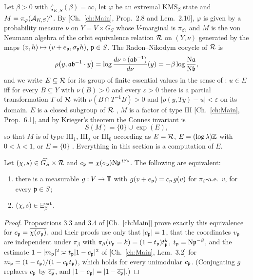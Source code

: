 Let $\beta>0$ with $\zeta_{K,S}(\beta)=\infty$, let $\varphi$ be an extremal
$\mathrm{KMS}_\beta$ state and $M=\pi_\varphi(\mathcal{A}_{K,S})''$. By [Ch.~\ref{ch:Main}, Prop.~2.8 and
Lem.~2.10], $\varphi$ is given by a probability measure $\nu$ on $Y=V\times G_S$ whose
$V$-marginal is $\pi_\beta$, and $M$ is the von Neumann algebra of the orbit equivalence
relation $\mathcal{R}$ on $(Y,\nu)$ generated by the maps $(v,h)\mapsto(v+e_{\mathfrak{p}},\sigma_{\mathfrak{p}} h)$,
$\mathfrak{p}\in S$. The Radon--Nikodym cocycle of $\mathcal{R}$ is
\begin{equation}\label{I:eq:rho}
\rho\bigl(y,\mathfrak{a}\mathfrak{b}^{-1}\cdot y\bigr)=\log\frac{d\nu\circ(\mathfrak{a}\mathfrak{b}^{-1})}{d\nu}(y)
=-\beta\log\frac{\mathrm{N}\mathfrak{a}}{\mathrm{N}\mathfrak{b}},
\end{equation}
and we write $E\subseteq\mathcal{R}$ for its group of finite essential values in the sense of
\cite{Schmidt}: $u\in E$ iff for every $B\subseteq Y$ with $\nu(B)>0$ and every
$\varepsilon>0$ there is a partial transformation $T$ of $\mathcal{R}$ with
$\nu(B\cap T^{-1}B)>0$ and $|\rho(y,Ty)-u|<\varepsilon$ on its domain. $E$ is a closed
subgroup of $\mathcal{R}$ \cite{Schmidt}, $M$ is a factor of type $\mathrm{III}$
[Ch.~\ref{ch:Main}, Prop.~6.1], and by Krieger's theorem \cite{Krieger} the Connes invariant is
\begin{equation}\label{I:eq:SM}
S(M)=\{0\}\cup\exp(E),
\end{equation}
so that $M$ is of type $\mathrm{III}_1$, $\mathrm{III}_\lambda$ or $\mathrm{III}_0$
according as $E=\mathcal{R}$, $E=(\log\lambda)\mathbb{Z}$ with $0<\lambda<1$, or $E=\{0\}$ \cite{Connes73}.
Everything in this section is a computation of $E$.

\begin{lemma}\label{I:lem:dict}
Let $(\chi,s)\in\widehat{G_S}\times\mathcal{R}$ and $c_{\mathfrak{p}}=\chi(\sigma_{\mathfrak{p}})\mathrm{N}\mathfrak{p}^{\,i\beta s}$. The
following are equivalent:
\begin{enumerate}
\item there is a measurable $g:V\to\mathbb{T}$ with $g(v+e_{\mathfrak{p}})=c_{\mathfrak{p}}\,g(v)$ for $\pi_\beta$-a.e.\
$v$, for every $\mathfrak{p}\in S$;
\item $(\chi,s)\in\Xi^{\mathrm{ext}}_\beta$.
\end{enumerate}
\end{lemma}

\begin{proof}
Propositions 3.3 and 3.4 of [Ch.~\ref{ch:Main}] prove exactly this equivalence for
$c_{\mathfrak{p}}=\overline{\chi(\sigma_{\mathfrak{p}})}$, and their proofs use only that $|c_{\mathfrak{p}}|=1$, that the
coordinates $v_{\mathfrak{p}}$ are independent under $\pi_\beta$ with $\pi_\beta(v_{\mathfrak{p}}=k)=(1-t_{\mathfrak{p}})t_{\mathfrak{p}}^k$,
$t_{\mathfrak{p}}=\mathrm{N}\mathfrak{p}^{-\beta}$, and the estimate $1-|m_{\mathfrak{p}}|^2\asymp t_{\mathfrak{p}}|1-c_{\mathfrak{p}}|^2$ of
[Ch.~\ref{ch:Main}, Lem.~3.2] for $m_{\mathfrak{p}}=(1-t_{\mathfrak{p}})/(1-c_{\mathfrak{p}} t_{\mathfrak{p}})$, which holds for every unimodular
$c_{\mathfrak{p}}$. (Conjugating $g$ replaces $c_{\mathfrak{p}}$ by $\overline{c_{\mathfrak{p}}}$, and
$|1-c_{\mathfrak{p}}|=|1-\overline{c_{\mathfrak{p}}}|$.)
\end{proof}

